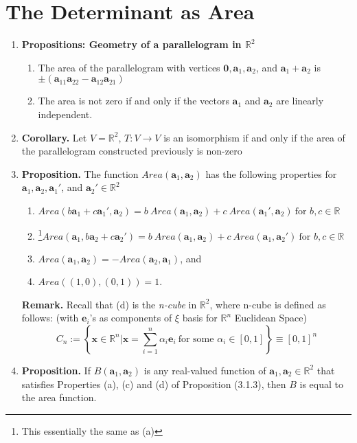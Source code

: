 \documentclass[oneside, 12pt]{book}
\newcommand{\settag}[1]{\renewcommand{\theenumi}{#1}}
\newcommand{\R}{\mathbb{R}}
\newcommand{\tbf}[1]{\textbf{#1}}
\newcommand{\trans}[3]{$#1:#2\rightarrow{}#3$}
\newcommand{\para}[1]{\item \tbf{#1}}
\newcommand{\va}{\mathbf{a}}
\newcommand{\vx}{\mathbf{x}}
\newcommand{\ve}{\mathbf{e}}
\begin{document}
\section{The Determinant as Area}
\begin{enumerate}
    \settag{3.1.1}
    \para{Propositions: Geometry of a parallelogram in $\R^2$} 
    \begin{enumerate}
        \item The area of the parallelogram with vertices $\mathbf{0}, \va_1, \va_2$, and $\va_1 + \va_2$ is $\pm\left(\va_{11}\va_{22} - \va_{12}\va_{21}\right)$
        \item The area is not zero if and only if the vectors $\va_1$ and $\va_2$ are linearly independent.
    \end{enumerate}
    
    \settag{3.1.2}
    \para{Corollary.} Let $V=\R^2$, \trans{T}{V}{V} is an isomorphism if and only if the area of the parallelogram constructed previously is non-zero
    
    \settag{3.1.3}
    \para{Proposition.} The function $Area(\va_1, \va_2)$ has the following properties for $\va_1,\va_2, \va_1'$, and $\va_2'\in \R^2$
    \begin{enumerate}
        \item $Area(b\va_1 + c\va_1', \va_2) = b~Area(\va_1,\va_2) + c~Area(\va_1', \va_2)~\text{for $b, c \in \R$}$
        \item \footnote{This essentially the same as (a)}$Area(\va_1, b\va_2 + c\va_2') = b~Area(\va_1,\va_2) + c~Area(\va_1, \va_2')~\text{for $b, c \in \R$}$
        \item $Area(\va_1, \va_2) = -Area(\va_2, \va_1)$, and
        \item $Area((1, 0), (0, 1)) = 1$.
    \end{enumerate}
    \textbf{Remark.} Recall that (d) is the \textit{n-cube} in $\R^2$, where n-cube is defined as follows: (with $\ve_i$'s as components of $\xi$ basis for $\R^n$ Euclidean Space)
    \begin{equation*}
        C_n := \left\{\vx \in \R^n| \vx = \sum_{i = 1}^n \alpha_i \ve_i~\text{for some $\alpha_i\in \left[0, 1\right]$}\right\} \equiv \left[0, 1\right]^n
    \end{equation*}
    
    \settag{3.1.4}
    \para{Proposition.} If $B(\va_1, \va_2)$ is any real-valued function of $\va_1, \va_2\in \R^2$ that satisfies Properties (a), (c) and (d) of Proposition (3.1.3), then $B$ is equal to the area function.
    

\end{enumerate}
\end{document}
